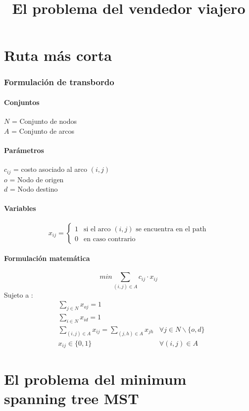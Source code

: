 \documentclass{article}
\title{El problema del vendedor viajero}
\numberwithin{equation}{section}
\begin{document}
\part{Ruta más corta}
\section{Formulación de transbordo}
\subsection{Conjuntos}
$N$ = Conjunto de nodos\\
$A$ = Conjunto de arcos
\subsection{Parámetros}
$c_{ij}$ = costo asociado al arco $(i,j)$\\
$o$ = Nodo de origen\\
$d$ = Nodo destino
\subsection{Variables}
\begin{flushleft}
\[x_{ij}={\begin{cases}1&{\mbox{si el arco $(i,j)$ se encuentra en el path}}\\0&{\mbox{en caso contrario}}\end{cases}}
\]
\end{flushleft}
\subsection{Formulación matemática}
\begin{equation}
min \sum_{(i,j) \in A} c_{ij} \cdot x_{ij}
\end{equation}
Sujeto a : \begin{align}
& \sum_{j \in N} x_{oj} = 1 \\
& \sum_{i \in N} x_{id} = 1 \\
& \sum_{(i,j) \in A} x_{ij} = \sum_{(j,h) \in A} x_{jh} &\forall j \in N \backslash \{o,d\} \\
& x_{ij} \in \{0,1\} &\forall (i,j) \in A
\end{align}




\newpage
\part{El problema del minimum spanning tree MST}
\end{document}
